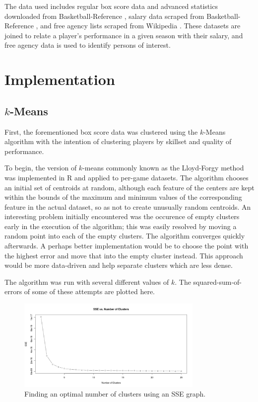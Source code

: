 \documentclass{article}
\begin{document}
The data used includes regular box score data and advanced statistics downloaded from Basketball-Reference \cite{brseason}, salary data scraped from Basketball-Reference \cite{brplayers}, and free agency lists scraped from Wikipedia \cite{wikipedia}. These datasets are joined to relate a player's performance in a given season with their salary, and free agency data is used to identify persons of interest.

\section{Implementation}

\subsection{$k$-Means}

First, the forementioned box score data was clustered using the $k$-Means algorithm with the intention of clustering players by skillset and quality of performance.

To begin, the version of $k$-means commonly known as the Lloyd-Forgy method was implemented in R and applied to per-game datasets. The algorithm chooses an initial set of centroids at random, although each feature of the centers are kept within the bounds of the maximum and minimum values of the corresponding feature in the actual dataset, so as not to create unusually random centroids. An interesting problem initially encountered was the occurence of empty clusters early in the execution of the algorithm; this was easily resolved by moving a random point into each of the empty clusters. The algorithm converges quickly afterwards. A perhaps better implementation would be to choose the point with the highest error and move that into the empty cluster instead. This approach would be more data-driven and help separate clusters which are less dense.

The algorithm was run with several different values of $k$. The squared-sum-of-errors of some of these attempts are plotted here.

\begin{figure}[h!]
    \centering
    \includegraphics[width=0.8\textwidth]{sse.jpeg}
    \caption{Finding an optimal number of clusters using an SSE graph.}
\end{figure}
\end{document}
